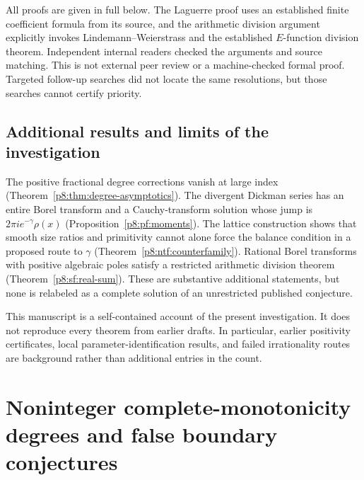 \documentclass[11pt,a4paper]{article}
\theoremstyle{definition}
\theoremstyle{remark}
\numberwithin{equation}{section}
\begin{document}
All proofs are given in full below. The Laguerre proof uses an established
finite coefficient formula from its source, and the arithmetic division
argument explicitly invokes Lindemann--Weierstrass and the established
$E$-function division theorem. Independent internal readers checked the
arguments and source matching. This is not external peer review or a
machine-checked formal proof. Targeted follow-up searches did not locate
the same resolutions, but those searches cannot certify priority.

\subsection{Additional results and limits of the investigation}
The positive fractional degree corrections vanish at large index
(Theorem~\ref{p8:thm:degree-asymptotics}). The divergent Dickman series has
an entire Borel transform and a Cauchy-transform solution whose jump
is $2\pi i e^{-\gamma}\rho(x)$ (Proposition~\ref{p8:pf:moments}).
The lattice construction shows that smooth size ratios and primitivity
cannot alone force the balance condition in a proposed route to
$\gamma$ (Theorem~\ref{p8:ntf:counterfamily}). Rational Borel transforms
with positive algebraic poles satisfy a restricted arithmetic division
theorem (Theorem~\ref{p8:sf:real-sum}). These are substantive additional
statements, but none is relabeled as a complete solution of an
unrestricted published conjecture.

This manuscript is a self-contained account of the present investigation.
It does not reproduce every theorem from earlier drafts. In particular,
earlier positivity certificates, local parameter-identification results,
and failed irrationality routes are background rather than additional
entries in the count.


\section{Noninteger complete-monotonicity degrees and false boundary conjectures}
\label{p8:sec:frontier-inequalities}
\end{document}
